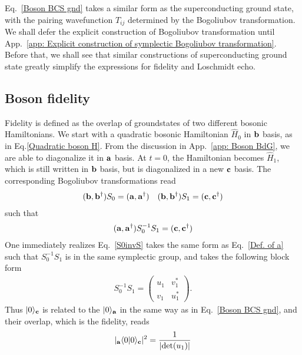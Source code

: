 Eq.~\eqref{Boson BCS gnd} takes a similar form as the superconducting ground state, with the pairing wavefunction $T_{ij}$ determined by the Bogoliubov transformation. We shall defer the explicit construction of Bogoliubov transformation until App.~\ref{app: Explicit construction of symplectic Bogoliubov transformation}. Before that, we shall see that similar constructions of superconducting ground state greatly simplify the expressions for fidelity and Loschmidt echo.

\subsection{Boson fidelity} 
\label{app: Boson fidelity}

Fidelity is defined as the overlap of groundstates of two different bosonic Hamiltonians. We start with a quadratic bosonic Hamiltonian $\hat{H}_0$ in ${\bf b}$ basis, as in Eq.\eqref{Quadratic boson H}. From the discussion in App.~\ref{app: Boson BdG}, we are able to diagonalize it in ${\bf a}$ basis. At $t=0$, the Hamiltonian becomes $\hat{H}_1$, which is still written in ${\bf b}$ basis, but is diagonalized in a new ${\bf c}$ basis. The corresponding Bogoliubov transformations read
\begin{eqnarray}\begin{aligned}
\label{Two BdG}
({\bf b} , {\bf b}^\dagger)S_0=({\bf a} , {\bf a}^\dagger)\quad
({\bf b} , {\bf b}^\dagger)S_1=({\bf c} , {\bf c}^\dagger)
\end{aligned}\end{eqnarray}
such that
\begin{eqnarray}\begin{aligned}
\label{S0invS}
({\bf a} , {\bf a}^\dagger)S_0^{-1}S_1=({\bf c} , {\bf c}^\dagger)
\end{aligned}\end{eqnarray}
One immediately realizes Eq.~\eqref{S0invS} takes the same form as Eq.~\eqref{Def. of a} such that $S_0^{-1}S_1$ is in the same symplectic group, and takes the following block form
\begin{eqnarray}
S_0^{-1}S_1=\left(\begin{array}{ccc}
u_1 & v_1^*\\
v_1 & u_1^*
\end{array}\right).
\end{eqnarray}
Thus $|0\rangle_{\bf c}$ is related to the $|0\rangle_{{\bf a}}$ in the same way as in Eq.~\eqref{Boson BCS gnd}, and their overlap, which is the fidelity, reads
\begin{eqnarray}\begin{aligned}
|_{\bf a}\langle0|0\rangle_{\bf c}|^2=\frac{1}{|\text{det}(u_1)|}
\end{aligned}\end{eqnarray}

